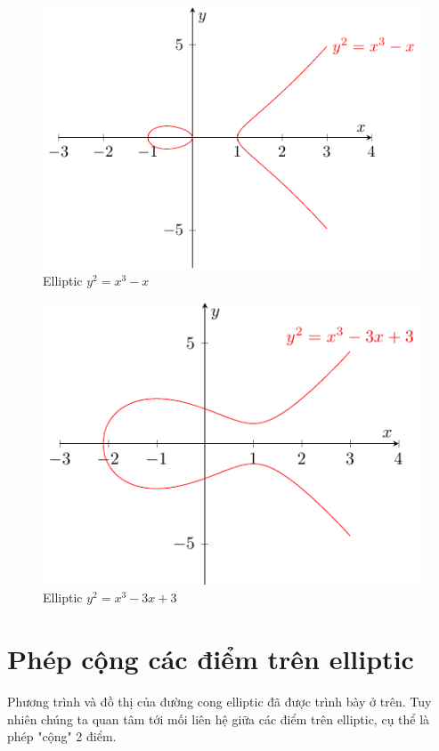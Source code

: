 \begin{figure}[ht]
    \centering
    \includegraphics{Elliptic/ecc2.pdf}
    \caption{Elliptic $y^2 = x^3 - x$}
    \label{ecc:2}
\end{figure}

\begin{figure}[ht]
    \centering
    \includegraphics{Elliptic/ecc3.pdf}
    \caption{Elliptic $y^2 = x^3 - 3x + 3$}
    \label{ecc:3}
\end{figure}

\section{Phép cộng các điểm trên elliptic}

Phương trình và đồ thị của đường cong elliptic đã được trình bày ở trên.
Tuy nhiên chúng ta quan tâm tới mối liên hệ giữa các điểm trên elliptic, 
cụ thể là phép "cộng" 2 điểm.

